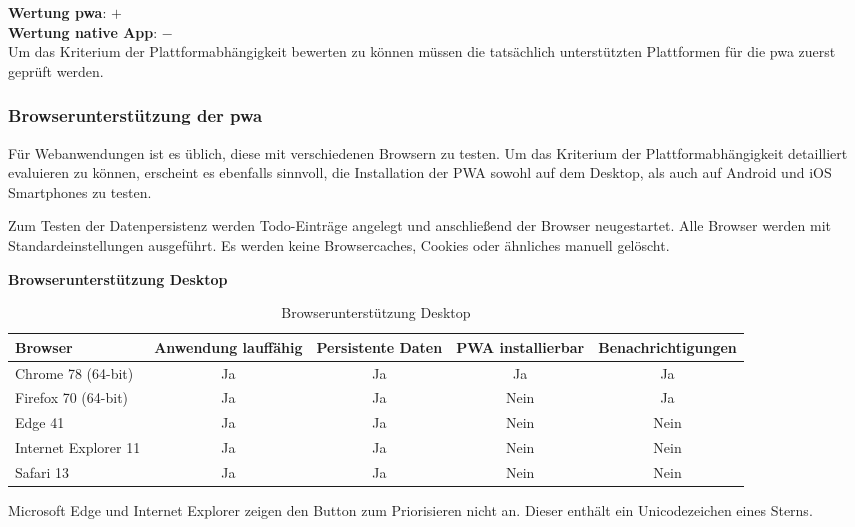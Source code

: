 \textbf{Wertung \ac{pwa}}: $+$ \\
\textbf{Wertung native App}: $-$  \\

Um das Kriterium der Plattformabhängigkeit bewerten zu können müssen die tatsächlich unterstützten Plattformen für die \ac{pwa} zuerst geprüft werden.

\subsubsection{Browserunterstützung der \acs{pwa}}
Für Webanwendungen ist es üblich, diese mit verschiedenen Browsern zu testen. Um das Kriterium der Plattformabhängigkeit detailliert evaluieren zu können, erscheint es ebenfalls sinnvoll, die Installation der PWA sowohl auf dem Desktop, als auch auf Android und iOS Smartphones zu testen.

Zum Testen der Datenpersistenz werden Todo-Einträge angelegt und anschließend der Browser neugestartet.
Alle Browser werden mit Standardeinstellungen ausgeführt. Es werden keine Browsercaches, Cookies oder ähnliches manuell gelöscht.

\textbf{Browserunterstützung Desktop} 

\begin{table}[h!]
	\centering
	\begin{tabularx}{\textwidth}{|l||C|C|C|c|}
		\hline
		Browser              & Anwendung lauffähig & Persistente Daten & PWA installierbar & Benachrichtigungen \\
		\hline
		Chrome 78 (64-bit)   & Ja                  & Ja                & Ja                & Ja                 \\
		Firefox 70 (64-bit)  & Ja                  & Ja                & Nein              & Ja                 \\
		Edge 41    & Ja                  & Ja                & Nein              & Nein               \\
		Internet Explorer 11 & Ja                  & Ja                & Nein              & Nein               \\
		Safari 13            & Ja                  & Ja                & Nein              & Nein               \\
		\hline
	\end{tabularx}
	\caption{Browserunterstützung Desktop} \label{tab:browser_desktop}
\end{table}

Microsoft Edge und Internet Explorer zeigen den Button zum Priorisieren nicht an. Dieser enthält ein Unicodezeichen eines Sterns.

